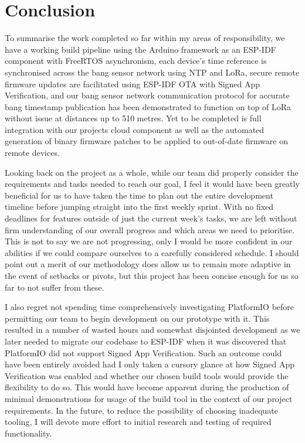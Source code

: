\documentclass[conference]{IEEEtran}
\begin{document}
\section{Conclusion}

To summarise the work completed so far within my areas of responsibility, we have a working build pipeline using the Arduino framework as an ESP-IDF component with FreeRTOS asynchronism, each device's time reference is synchronised across the bang sensor network using NTP and LoRa, secure remote firmware updates are facilitated using ESP-IDF OTA with Signed App Verification, and our bang sensor network communication protocol for accurate bang timestamp publication has been demonstrated to function on top of LoRa without issue at distances up to 510 metres. Yet to be completed is full integration with our projects cloud component as well as the automated generation of binary firmware patches to be applied to out-of-date firmware on remote devices.

Looking back on the project as a whole, while our team did properly consider the requirements and tasks needed to reach our goal, I feel it would have been greatly beneficial for us to have taken the time to plan out the entire development timeline before jumping straight into the first weekly sprint. With no fixed deadlines for features outside of just the current week's tasks, we are left without firm understanding of our overall progress and which areas we need to prioritise. This is not to say we are not progressing, only I would be more confident in our abilities if we could compare ourselves to a carefully considered schedule. I should point out a merit of our methodology does allow us to remain more adaptive in the event of setbacks or pivots, but this project has been concise enough for us so far to not suffer from these.

I also regret not spending time comprehensively investigating PlatformIO before permitting our team to begin development on our prototype with it. This resulted in a number of wasted hours and somewhat disjointed development as we later needed to migrate our codebase to ESP-IDF when it was discovered that PlatformIO did not support Signed App Verification. Such an outcome could have been entirely avoided had I only taken a cursory glance at how Signed App Verification was enabled and whether our chosen build tools would provide the flexibility to do so. This would have become apparent during the production of minimal demonstrations for usage of the build tool in the context of our project requirements. In the future, to reduce the possibility of choosing inadequate tooling, I will devote more effort to initial research and testing of required functionality.

\printbibliography
\end{document}
